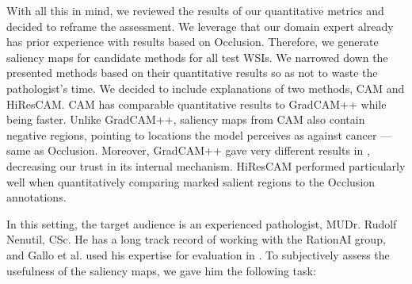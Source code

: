 With all this in mind, we reviewed the results of our quantitative metrics and decided to reframe the assessment.
We leverage that our domain expert already has prior experience with results based on Occlusion.
Therefore, we generate saliency maps for candidate methods for all test WSIs.
We narrowed down the presented methods based on their quantitative results so as not to waste the pathologist's time.
We decided to include explanations of two methods, CAM and HiResCAM.
CAM has comparable quantitative results to GradCAM++ while being faster.
Unlike GradCAM++, saliency maps from CAM also contain negative regions, pointing to locations the model perceives as against cancer --- same as Occlusion.
Moreover, GradCAM++ gave very different results in , decreasing our trust in its internal mechanism.
HiResCAM performed particularly well when quantitatively comparing marked salient regions to the Occlusion annotations.

In this setting, the target audience is an experienced pathologist, MUDr. Rudolf Nenutil, CSc.
He has a long track record of working with the RationAI group, and Gallo et al. used his expertise for evaluation in \cite{gallo}.
To subjectively assess the usefulness of the saliency maps, we gave him the following task:

